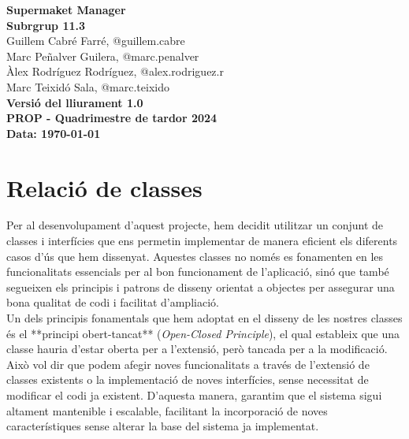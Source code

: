\documentclass[a4paper,12pt]{report}
\newcommand{\titolPractica}{Supermaket Manager}
\newcommand{\identificadorEquip}{Subrgrup 11.3}
\newcommand{\PROPquatrimestre}{PROP - Quadrimestre de tardor 2024}
\newcommand{\versioLliurament}{Versió del lliurament 1.0}
\begin{document}
\begin{titlepage}
    \begin{center}
        {\Large \textbf{\titolPractica}} \\[10cm]
        \textbf{\large \identificadorEquip} \\[1cm]
        Guillem Cabré Farré, \small{@guillem.cabre} \\
        Marc Peñalver Guilera, \small{@marc.penalver} \\
        Àlex Rodríguez Rodríguez, \small{@alex.rodriguez.r} \\
        Marc Teixidó Sala, \small{@marc.teixido} \\[2cm]
        \textbf{\versioLliurament} \\
        \textbf{\PROPquatrimestre} \\
        \textbf{Data: \today}
    \end{center}
\end{titlepage}

\tableofcontents
\clearpage

\chapter{Relació de classes}

Per al desenvolupament d'aquest projecte, hem decidit utilitzar un conjunt de classes i interfícies que ens permetin implementar de manera eficient els diferents casos d'ús que hem dissenyat. Aquestes classes no només es fonamenten en les funcionalitats essencials per al bon funcionament de l'aplicació, sinó que també segueixen els principis i patrons de disseny orientat a objectes per assegurar una bona qualitat de codi i facilitat d'ampliació. \\

Un dels principis fonamentals que hem adoptat en el disseny de les nostres classes és el **principi obert-tancat** (\textit{Open-Closed Principle}), el qual estableix que una classe hauria d'estar oberta per a l'extensió, però tancada per a la modificació. Això vol dir que podem afegir noves funcionalitats a través de l'extensió de classes existents o la implementació de noves interfícies, sense necessitat de modificar el codi ja existent. D'aquesta manera, garantim que el sistema sigui altament mantenible i escalable, facilitant la incorporació de noves característiques sense alterar la base del sistema ja implementat. \\
\end{document}
